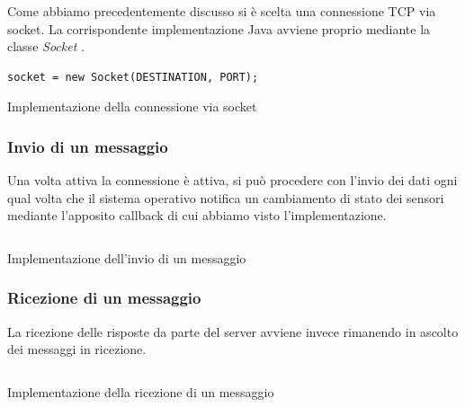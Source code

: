 Come abbiamo precedentemente discusso si è scelta una connessione TCP via socket. La corrispondente implementazione Java
avviene proprio mediante la classe \textit{Socket} \cite{socket}.
\begin{listing}[H] 
    \begin{verbatim}
socket = new Socket(DESTINATION, PORT);
    \end{verbatim}
    \caption{Implementazione della connessione via socket}
\end{listing}

\subsubsection{Invio di un messaggio}
Una volta attiva la connessione è attiva, si può procedere con l'invio dei dati ogni qual volta che il sistema 
operativo notifica un cambiamento di stato dei sensori mediante l'apposito callback 
di cui abbiamo visto l'implementazione.
\begin{listing}[H] 
    \inputminted[frame=single,framesep=10pt]{java}{snippets/app/connection/send.java}
    \caption{Implementazione dell'invio di un messaggio}
\end{listing}

\subsubsection{Ricezione di un messaggio}
La ricezione delle risposte da parte del server avviene invece rimanendo in ascolto 
dei messaggi in ricezione.
\begin{listing}[H] 
    \inputminted[frame=single,framesep=10pt]{java}{snippets/app/connection/receive.java}
    \caption{Implementazione della ricezione di un messaggio}
\end{listing}